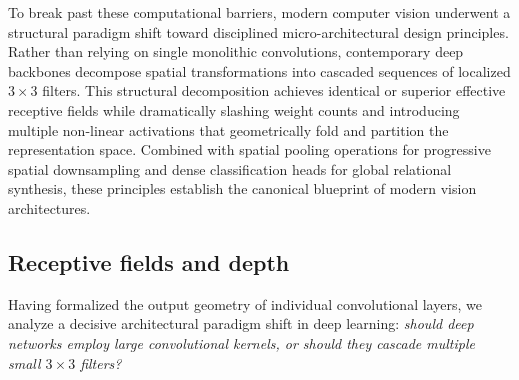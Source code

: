 To break past these computational barriers, modern computer vision underwent a structural paradigm shift toward disciplined micro-architectural design principles. Rather than relying on single monolithic convolutions, contemporary deep backbones decompose spatial transformations into cascaded sequences of localized $3 \times 3$ filters. This structural decomposition achieves identical or superior effective receptive fields while dramatically slashing weight counts and introducing multiple non-linear activations that geometrically fold and partition the representation space. Combined with spatial pooling operations for progressive spatial downsampling and dense classification heads for global relational synthesis, these principles establish the canonical blueprint of modern vision architectures.

\subsection{Receptive fields and depth}
\label{sec:vgg_principle_stacking_small_kernels}

Having formalized the output geometry of individual convolutional layers, we analyze a decisive architectural paradigm shift in deep learning: \textit{should deep networks employ large convolutional kernels, or should they cascade multiple small $3 \times 3$ filters?}~\cite{simonyan2014very,bishop2024deep}

